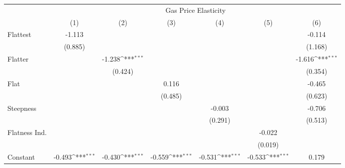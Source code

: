 {
\def\sym#1{\ifmmode^{#1}\else\(^{#1}\)\fi}
\begin{tabular}{l*{6}{c}}
\hline\hline
            &\multicolumn{6}{c}{Gas Price Elasticity}                                                                                           \\
            &\multicolumn{1}{c}{(1)}         &\multicolumn{1}{c}{(2)}         &\multicolumn{1}{c}{(3)}         &\multicolumn{1}{c}{(4)}         &\multicolumn{1}{c}{(5)}         &\multicolumn{1}{c}{(6)}         \\
\hline
Flattest    &      -1.113         &                     &                     &                     &                     &      -0.114         \\
            &     (0.885)         &                     &                     &                     &                     &     (1.168)         \\
[1em]
Flatter     &                     &      -1.238\sym{***}&                     &                     &                     &      -1.616\sym{***}\\
            &                     &     (0.424)         &                     &                     &                     &     (0.354)         \\
[1em]
Flat        &                     &                     &       0.116         &                     &                     &      -0.465         \\
            &                     &                     &     (0.485)         &                     &                     &     (0.623)         \\
[1em]
Steepness   &                     &                     &                     &      -0.003         &                     &      -0.706         \\
            &                     &                     &                     &     (0.291)         &                     &     (0.513)         \\
[1em]
Flatness Ind.&                     &                     &                     &                     &      -0.022         &                     \\
            &                     &                     &                     &                     &     (0.019)         &                     \\
[1em]
Constant    &      -0.493\sym{***}&      -0.430\sym{***}&      -0.559\sym{***}&      -0.531\sym{***}&      -0.533\sym{***}&       0.179         \\

\end{tabular}}

